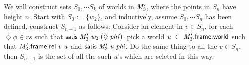 \documentclass[letterpaper]{article}
\renewcommand{\HOLConst}[1]{{\textsf{\upshape\small #1}}}
\renewcommand{\HOLinline}[1]{\ensuremath{#1}}
\begin{document}
We will construct sets $S_0,\cdots S_k$ of worlds in \HOLinline{\HOLFreeVar{M\sb{\mathrm{3}}\sp{\prime}}}, where the points in $S_n$ have height $n$. Start with $S_0:=\{w_2\}$, and inductively, assume $S_0,\cdots S_n$ has been defined, construct $S_{n+1}$ as follows: Consider an element in $v\in S_n$, for each $\Diamond \phi\in rs$ such that \HOLinline{\HOLConst{satis}\;\HOLFreeVar{M\sb{\mathrm{3}}\sp{\prime}}\;\HOLFreeVar{w\sb{\mathrm{2}}}\;(\HOLSymConst{\ensuremath{\Diamond}}\;\HOLFreeVar{phi})}, pick a world \HOLinline{\HOLFreeVar{u}\;\HOLSymConst{\HOLTokenIn{}}\;\HOLFreeVar{M\sb{\mathrm{3}}\sp{\prime}}.\HOLFieldName{frame}.\HOLFieldName{world}} such that \HOLinline{\HOLFreeVar{M\sb{\mathrm{3}}\sp{\prime}}.\HOLFieldName{frame}.\HOLFieldName{rel}\;\HOLFreeVar{v}\;\HOLFreeVar{u}} and \HOLinline{\HOLConst{satis}\;\HOLFreeVar{M\sb{\mathrm{3}}\sp{\prime}}\;\HOLFreeVar{u}\;\HOLFreeVar{phi}}. Do the same thing to all the $v\in S_n$, then $S_{n+1}$ is the set of all the such $u$'s which are seleted in this way. 
\end{document}

